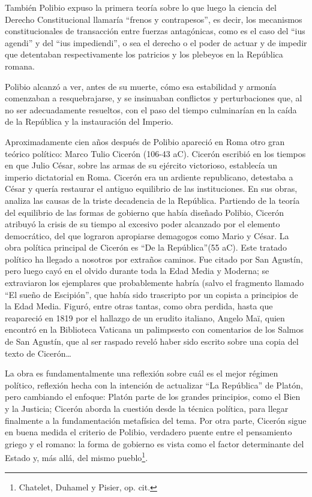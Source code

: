 \documentclass[
]{book}
\begin{document}
También Polibio expuso la primera teoría sobre lo que luego la ciencia del Derecho Constitucional llamaría ``frenos y contrapesos'', es decir, los mecanismos constitucionales de transacción entre fuerzas antagónicas, como es el caso del ``ius agendi'' y del ``ius impediendi'', o sea el derecho o el poder de actuar y de impedir que detentaban respectivamente los patricios y los plebeyos en la República romana.

Polibio alcanzó a ver, antes de su muerte, cómo esa estabilidad y armonía comenzaban a resquebrajarse, y se insinuaban conflictos y perturbaciones que, al no ser adecuadamente resueltos, con el paso del tiempo culminarían en la caída de la República y la instauración del Imperio.

Aproximadamente cien años después de Polibio apareció en Roma otro gran teórico político: Marco Tulio Cicerón (106-43 aC). Cicerón escribió en los tiempos en que Julio César, sobre las armas de su ejército victorioso, establecía un imperio dictatorial en Roma. Cicerón era un ardiente republicano, detestaba a César y quería restaurar el antiguo equilibrio de las instituciones. En sus obras, analiza las causas de la triste decadencia de la República. Partiendo de la teoría del equilibrio de las formas de gobierno que había diseñado Polibio, Cicerón atribuyó la crisis de su tiempo al excesivo poder alcanzado por el elemento democrático, del que lograron apropiarse demagogos como Mario y César. La obra política principal de Cicerón es ``De la República''(55 aC). Este tratado político ha llegado a nosotros por extraños caminos. Fue citado por San Agustín, pero luego cayó en el olvido durante toda la Edad Media y Moderna; se extraviaron los ejemplares que probablemente habría (salvo el fragmento llamado ``El sueño de Escipión'', que había sido trascripto por un copista a principios de la Edad Media. Figuró, entre otras tantas, como obra perdida, hasta que reapareció en 1819 por el hallazgo de un erudito italiano, Angelo Maï, quien encontró en la Biblioteca Vaticana un palimpsesto con comentarios de los Salmos de San Agustín, que al ser raspado reveló haber sido escrito sobre una copia del texto de Cicerón\ldots{}

La obra es fundamentalmente una reflexión sobre cuál es el mejor régimen político, reflexión hecha con la intención de actualizar ``La República'' de Platón, pero cambiando el enfoque: Platón parte de los grandes principios, como el Bien y la Justicia; Cicerón aborda la cuestión desde la técnica política, para llegar finalmente a la fundamentación metafísica del tema. Por otra parte, Cicerón sigue en buena medida el criterio de Polibio, verdadero puente entre el pensamiento griego y el romano: la forma de gobierno es vista como el factor determinante del Estado y, más allá, del mismo pueblo\footnote{Chatelet, Duhamel y Pisier, op. cit.}.
\end{document}
